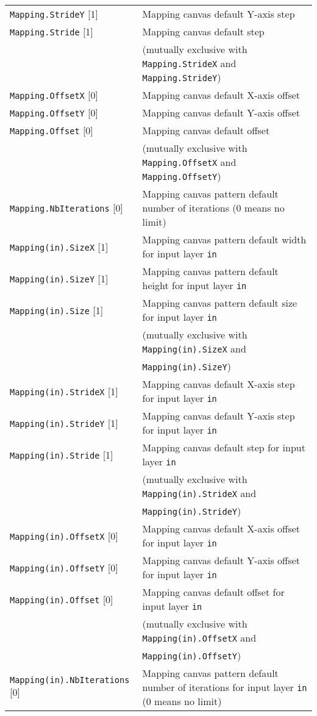 \documentclass[a4paper,11pt,oneside]{article}
\begin{document}
\begin{center}
\begin{longtable}{| p{5cm} | p{10cm} | }
  \lstinline!Mapping.StrideY! [1] & Mapping canvas default Y-axis step \\
  \lstinline!Mapping.Stride! [1] & Mapping canvas default step \\
   & (mutually exclusive with \lstinline!Mapping.StrideX!
   and \lstinline!Mapping.StrideY!) \\
  \lstinline!Mapping.OffsetX! [0] & Mapping canvas default X-axis offset \\
  \lstinline!Mapping.OffsetY! [0] & Mapping canvas default Y-axis offset \\
  \lstinline!Mapping.Offset! [0] & Mapping canvas default offset \\
   & (mutually exclusive with \lstinline!Mapping.OffsetX!
   and \lstinline!Mapping.OffsetY!) \\
  \lstinline!Mapping.NbIterations! [0] & Mapping canvas pattern default number
   of iterations (0 means no limit) \\
  \lstinline!Mapping(in).SizeX! [1] & Mapping canvas pattern default width
  for input layer \lstinline!in! \\
  \lstinline!Mapping(in).SizeY! [1] & Mapping canvas pattern default height
   for input layer \lstinline!in! \\
  \lstinline!Mapping(in).Size! [1] & Mapping canvas pattern default size
  for input layer \lstinline!in! \\
   & (mutually exclusive with \lstinline!Mapping(in).SizeX! and \\
   & \lstinline!Mapping(in).SizeY!) \\
  \lstinline!Mapping(in).StrideX! [1] & Mapping canvas default X-axis step
   for input layer \lstinline!in! \\
  \lstinline!Mapping(in).StrideY! [1] & Mapping canvas default Y-axis step
  for input layer \lstinline!in! \\
  \lstinline!Mapping(in).Stride! [1] & Mapping canvas default step
  for input layer \lstinline!in! \\
   & (mutually exclusive with \lstinline!Mapping(in).StrideX! and \\
   & \lstinline!Mapping(in).StrideY!) \\
  \lstinline!Mapping(in).OffsetX! [0] & Mapping canvas default X-axis offset
  for input layer \lstinline!in! \\
  \lstinline!Mapping(in).OffsetY! [0] & Mapping canvas default Y-axis offset
  for input layer \lstinline!in! \\
  \lstinline!Mapping(in).Offset! [0] & Mapping canvas default offset for input
   layer \lstinline!in! \\
   & (mutually exclusive with \lstinline!Mapping(in).OffsetX! and \\
   & \lstinline!Mapping(in).OffsetY!) \\
  \lstinline!Mapping(in).NbIterations! [0] & Mapping canvas pattern default
  number of iterations for input layer \lstinline!in! (0 means no limit) \\
 \hline
\end{longtable}
\end{center}
\end{document}
